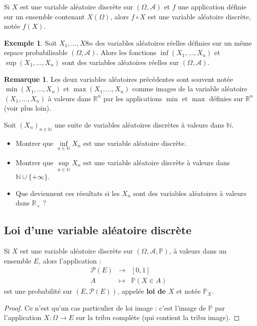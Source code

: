 \documentclass[french]{article}
\renewcommand{\P}{\mathbb{P}}
\newcommand{\N}{\mathbb{N}}
\newcommand{\R}{\mathbb{R}}
\theoremstyle{plain}
\theoremstyle{definition}
\newtheorem*{ex}{Exemple}
\newtheorem*{rmq}{Remarque}
\theoremstyle{remark}
\begin{document}
\begin{prop}%
	Si $X$ est une variable aléatoire discrète sur $(\Omega,\mathcal{A})$ et $f$ une application définie sur un ensemble contenant $X(\Omega)$, alors $f\circ X$ est une variable aléatoire discrète, notée $f(X)$.
\end{prop}

\begin{ex}
	Soit $X_1,\ldots,X8n$ des variables aléatoires réelles définies sur un même espace probabilisable $(\Omega,\mathcal{A})$. Alors les fonctions $\inf(X_1,\ldots,X_n)$ et $\sup(X_1,\ldots,X_n)$ sont des variables aléatoires réelles sur $(\Omega,\mathcal{A})$.
\end{ex}

\begin{rmq}
	Les deux variables aléatoires précédentes sont souvent notée $\min(X_1,\ldots,X_n)$ et $\max(X_1,\ldots,X_n)$ comme images de la variable aléatoire $(X_1,\ldots,X_n)$ à valeurs dans $\R^n$ par les applications $\min$ et $\max$ définies sur $\R^n$ (voir plus loin).
\end{rmq}

\begin{exo}
	Soit $(X_n)_{n\in\N}$ une suite de variables aléatoires discrètes à valeurs dans $\N$.
	\begin{itemize}
		\item Montrer que $\underset{n\in\N}{\inf}X_n$ est une variable aléatoire discrète.
		\item Montrer que $\underset{n\in\N}{\sup}X_n$ est une variable aléatoire discrète à valeurs dans $\N\cup\{+\infty\}$.
		\item Que deviennent ces résultats si les $X_n$ sont des variables aléatoires à valeurs dans $\R_+$ ?
	\end{itemize}
\end{exo}

\subsection{Loi d'une variable aléatoire discrète}

\begin{thm}%
	Si $X$ est une variable aléatoire discrète sur $(\Omega,\mathcal{A},\P)$, à valeurs dans un ensemble $E$, alors l'application :
	$$\begin{array}{rcl}
		\mathcal{P}(E)&\longrightarrow&[0,1]\\
		A&\longmapsto&\P(X\in A)
	\end{array}$$ est une probabilité sur $(E,\mathcal{P}(E))$, appelée \textbf{loi de $X$} et notée $\P_X$.
\end{thm}
\begin{proof}
	Ce n'est qu'un cas particulier de loi image : c'est l'image de $\P$ par l'application $X:\Omega\to E$ sur la tribu complète (qui contient la tribu image).
\end{proof}
\end{document}
